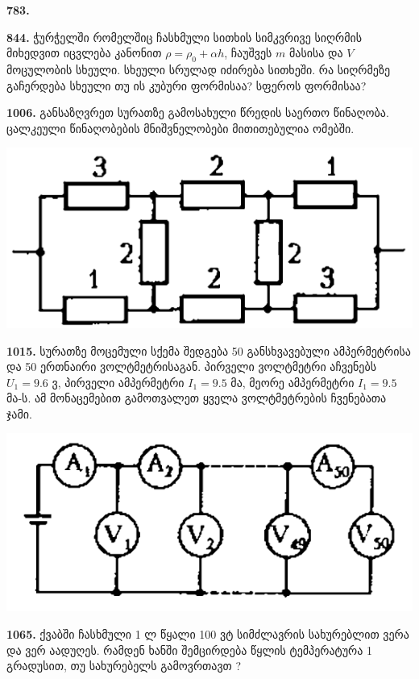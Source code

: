 \documentclass[12pt,a4paper,]{report}
\begin{document}
\textbf{783.} 

\textbf{844.} ჭურჭელში რომელშიც ჩასხმული სითხის სიმკვრივე სიღრმის მიხედვით იცვლება კანონით $\rho=\rho_0+\alpha h$, ჩაუშვეს $m$ მასისა და $V$ მოცულობის სხეული. სხეული სრულად იძირება სითხეში. რა სიღრმეზე გაჩერდება სხეული თუ ის კუბური ფორმისაა? სფეროს ფორმისაა?

\textbf{1006.} განსაზღვრეთ სურათზე გამოსახული წრედის საერთო წინაღობა. ცალკეული წინაღობების მნიშვნელობები მითითებულია ომებში. 
		\begin{center}
			\includegraphics[scale=0.4]{images/1006.png}
		\end{center}

\textbf{1015.} სურათზე მოცემული სქემა შედგება 50 განსხვავებული ამპერმეტრისა და 50 ერთნაირი ვოლტმეტრისაგან. პირველი ვოლტმეტრი აჩვენებს $U_1=9.6$ ვ, პირველი ამპერმეტრი $I_1=9.5$ მა, მეორე ამპერმეტრი $I_1=9.5$ მა-ს. ამ მონაცემებით გამოთვალეთ ყველა ვოლტმეტრების ჩვენებათა ჯამი. 
		\begin{center}
			\includegraphics[scale=0.4]{images/1015.png}
		\end{center}

\textbf{1065.} ქვაბში ჩასხმული 1 ლ წყალი 100 ვტ სიმძლავრის სახურებლით ვერა და ვერ აადუღეს. რამდენ ხანში შემცირდება წყლის ტემპერატურა 1 გრადუსით, თუ სახურებელს გამოვრთავთ ?
\end{document}
